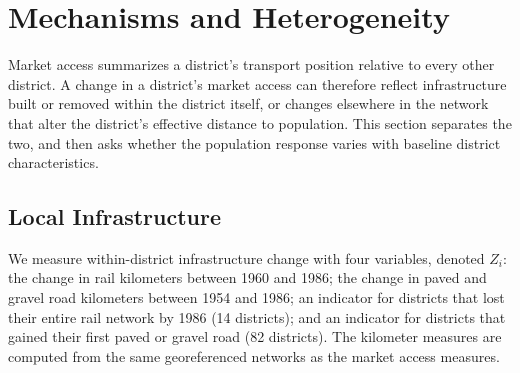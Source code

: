 %
%
%
%
%

\section{Mechanisms and Heterogeneity}
\label{sec:mechanisms}

Market access summarizes a district's transport position relative to
every other district. A change in a district's market access can
therefore reflect infrastructure built or removed within the district
itself, or changes elsewhere in the network that alter the district's
effective distance to population. This section separates the two,
and then asks whether the population response varies with baseline
district characteristics.

\subsection{Local Infrastructure}
\label{sec:local_infra}

We measure within-district infrastructure change with four variables,
denoted $Z_i$: the change in rail kilometers between 1960 and 1986;
the change in paved and gravel road kilometers between 1954 and 1986;
an indicator for districts that lost their entire rail network by
1986 (14 districts); and an indicator for districts that gained their
first paved or gravel road (82 districts). The kilometer measures are computed
from the same georeferenced networks as the market access measures.

